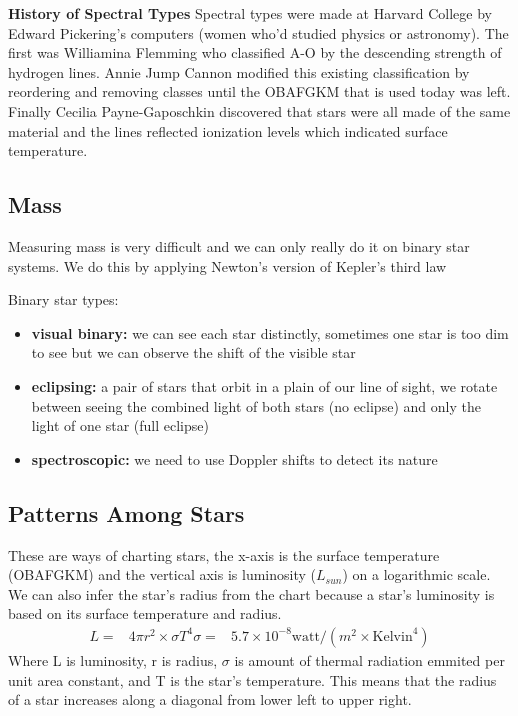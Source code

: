 \documentclass[12pt]{article}
\begin{document}
\textbf{History of Spectral Types}
Spectral types were made at Harvard College by Edward Pickering's computers (women who'd studied physics or astronomy). The first was Williamina Flemming who classified A-O by the descending strength of hydrogen lines. Annie Jump Cannon modified this existing classification by reordering and removing classes until the OBAFGKM that is used today was left. Finally Cecilia Payne-Gaposchkin discovered that stars were all made of the same material and the lines reflected ionization levels which indicated surface temperature.

\subsection{Mass}
Measuring mass is very difficult and we can only really do it on binary star systems. We do this by applying Newton's version of Kepler's third law

Binary star types:
\begin{itemize}
    \item \textbf{visual binary: } we can see each star distinctly, sometimes one star is too dim to see but we can observe the shift of the visible star
    \item \textbf{eclipsing: }  a pair of stars that orbit in a plain of our line of sight, we rotate between seeing the combined light of both stars (no eclipse) and only the light of one star (full eclipse)
    \item \textbf{spectroscopic: } we need to use Doppler shifts to detect its nature
\end{itemize}

\subsection{Patterns Among Stars}
These are ways of charting stars, the x-axis is the surface temperature (OBAFGKM) and the vertical axis is luminosity ($L_{sun}$) on a logarithmic scale. We can also infer the star's radius from the chart because a star's luminosity is based on its surface temperature and radius.
\begin{align*}
    L = & 4\pi r^2 \times \sigma T^4
    \sigma = & 5.7 \times 10^{-8}\text{watt}/(m^2 \times \text{Kelvin}^4)
\end{align*}
Where L is luminosity, r is radius, $\sigma$ is amount of thermal radiation emmited per unit area constant, and T is the star's temperature. This means that the radius of a star increases along a diagonal from lower left to upper right.
\end{document}
